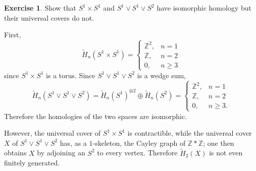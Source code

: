 \documentclass[10pt]{article}
\newcommand{\ZZ}{\mathbb{Z}}
\theoremstyle{definition}
\newtheorem{exer}{Exercise}
\begin{document}
\begin{exer}
Show that $S^1 \times S^1$ and $S^1 \vee S^1 \vee S^2$ have isomorphic homology but their universal covers do not.
\end{exer}

First,
$$\widetilde H_n(S^1 \times S^1) = \begin{cases}
\ZZ^2, &n = 1\\
\ZZ, &n = 2\\
0, &n \geq 3
\end{cases}$$
since $S^1 \times S^1$ is a torus. Since $S^1 \vee S^1 \vee S^2$ is a wedge sum,
$$\widetilde H_n(S^1 \vee S^1 \vee S^2) = \widetilde H_n(S^1)^{\oplus 2} \oplus \widetilde H_n(S^2) = \begin{cases}
\ZZ^2, &n = 1\\
\ZZ, &n = 2\\
0, &n \geq 3.
\end{cases}$$
Therefore the homologies of the two spaces are isomorphic.

However, the universal cover of $S^1 \times S^1$ is contractible, while the universal cover $X$ of $S^1 \vee S^1 \vee S^2$ has, as a $1$-skeleton, the Cayley graph of $\ZZ * \ZZ$; one then obtains $X$ by adjoining an $S^2$ to every vertex.
Therefore $\widetilde H_2(X)$ is not even finitely generated.
\end{document}
